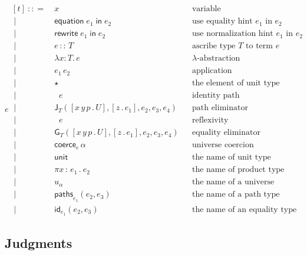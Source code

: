 \documentclass{article}
\newcommand{\T}{T} %
\newcommand{\U}{U} %
\newcommand{\x}{x} %
\newcommand{\e}{e} %
\newcommand{\bnf}{\ \mathrel{{:}{:}{=}}\ }
\newcommand{\bnfor}{\ \mid\ \ }
\newcommand{\lam}[2]{\lambda #1 {:} #2 .\,} %
\newcommand{\app}[2]{#1\,#2} %
\newcommand{\abst}[2]{[#1 \,.\, #2]} %
\newcommand{\ascribe}[2]{#1 \,{:}{:}\, #2} %
\newcommand{\unitTerm}{\star} %
\newcommand{\coerce}[2]{\mathsf{coerce}_{#1} \, #2}
\newcommand{\PrElim}[6]{\mathsf{J}_{#1}(#2, #3, #4, #5, #6)} %
\newcommand{\JuElim}[6]{\mathsf{G}_{#1}(#2, #3, #4, #5, #6)} %
\newcommand{\prRefl}[1]{\mathop{\mathsf{idpath}_{#1}}}  %
\newcommand{\juRefl}[1]{\mathop{\mathsf{refl}_{#1}}}    %
\newcommand{\nUnit}{\mathsf{unit}} %
\newcommand{\nProd}[2]{\pi #1\,{:}\,#2 \,.\ } %
\newcommand{\nUniverse}[1]{u_{#1}}  %
\newcommand{\nPrEqual}[3]{\mathsf{paths}_{#1}(#2,#3)} %
\newcommand{\nJuEqual}[3]{\mathsf{id}_{#1}(#2,#3)} %
\newcommand{\equationin}[1]{\mathsf{equation}\; #1 \; \mathsf{in} \;} %
\newcommand{\rewritein}[1]{\mathsf{rewrite}\; #1 \; \mathsf{in} \;} %
\begin{document}
\begin{equation*}
  \e
  \begin{aligned}[t]
    \bnf   {}&  \x   &&\text{variable} \\
    \bnfor {}&  \equationin{\e_1} e_2 &&\text{use equality hint $\e_1$ in $\e_2$} \\
    \bnfor {}&  \rewritein{\e_1} e_2 &&\text{use normalization hint $\e_1$ in $\e_2$} \\
    \bnfor {}&  \ascribe{\e}{\T}  &&\text{ascribe type $\T$ to term $\e$} \\
    \bnfor {}&  \lam{\x}{\T} \e  &&\text{$\lambda$-abstraction} \\
    \bnfor {}&   \app{\e_1}{\e_2}  &&\text{application} \\
    \bnfor {}&  \unitTerm  &&\text{the element of unit type} \\
    \bnfor {}&  \prRefl{\T}{\e}  &&\text{identity path} \\
    \bnfor {}&  \PrElim{\T}{\abst{x\,y\,p}{\U}}{\abst{z}{\e_1}}{\e_2}{\e_3}{\e_4}  &&\text{path eliminator} \\
    \bnfor {}&  \juRefl{\T}{\e}  &&\text{reflexivity} \\
    \bnfor {}&  \JuElim{\T}{\abst{x\,y\,p}{\U}}{\abst{z}{\e_1}}{\e_2}{\e_3}{\e_4}  &&\text{equality eliminator} \\
    \bnfor {}&  \coerce{\e}{\alpha}  &&\text{universe coercion} \\
    \bnfor {}&  \nUnit  &&\text{the name of unit type} \\
    \bnfor {}&  \nProd{\x}{\e_1} \e_2  &&\text{the name of product type} \\
    \bnfor {}&  \nUniverse{\alpha} &&\text{the name of a universe} \\
    \bnfor {}&  \nPrEqual{\e_1}{\e_2}{\e_3}  &&\text{the name of a path type} \\
    \bnfor {}&  \nJuEqual{\e_1}{\e_2}{\e_3}  &&\text{the name of an equality type}
  \end{aligned}
\end{equation*}

\subsection{Judgments}
\label{sec:bidirectional-judgments}
\end{document}
